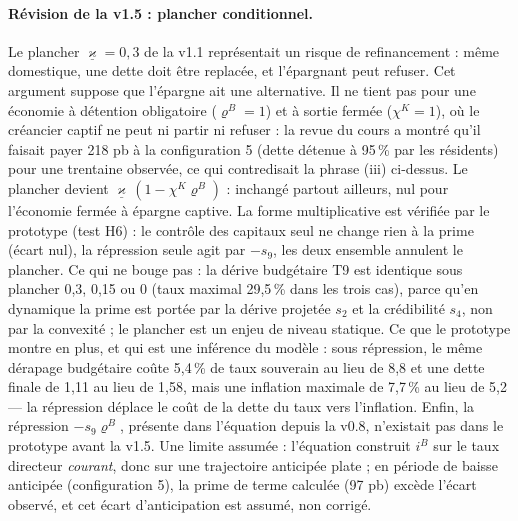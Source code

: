 \documentclass[11pt,a4paper]{article}
\begin{document}
\begin{lecture}
\paragraph{Révision de la v1.5 : plancher conditionnel.} Le plancher $\underline\varkappa=0{,}3$ de la v1.1 représentait un risque de refinancement : même domestique, une dette doit être replacée, et l'épargnant peut refuser. Cet argument suppose que l'épargne ait une alternative. Il ne tient pas pour une économie à détention obligatoire ($\varrho^B=1$) et à sortie fermée ($\chi^K=1$), où le créancier captif ne peut ni partir ni refuser : la revue du cours a montré qu'il faisait payer 218 pb à la configuration 5 (dette détenue à 95\,\% par les résidents) pour une trentaine observée, ce qui contredisait la phrase (iii) ci-dessus. Le plancher devient $\underline\varkappa\,(1-\chi^K\varrho^B)$ : inchangé partout ailleurs, nul pour l'économie fermée à épargne captive. La forme multiplicative est vérifiée par le prototype (test H6) : le contrôle des capitaux seul ne change rien à la prime (écart nul), la répression seule agit par $-s_9$, les deux ensemble annulent le plancher. Ce qui ne bouge pas : la dérive budgétaire T9 est identique sous plancher 0,3, 0,15 ou 0 (taux maximal 29,5\,\% dans les trois cas), parce qu'en dynamique la prime est portée par la dérive projetée $s_2$ et la crédibilité $s_4$, non par la convexité ; le plancher est un enjeu de niveau statique. Ce que le prototype montre en plus, et qui est une inférence du modèle : sous répression, le même dérapage budgétaire coûte 5,4\,\% de taux souverain au lieu de 8,8 et une dette finale de 1,11 au lieu de 1,58, mais une inflation maximale de 7,7\,\% au lieu de 5,2 — la répression déplace le coût de la dette du taux vers l'inflation. Enfin, la répression $-s_9\varrho^B$, présente dans l'équation depuis la v0.8, n'existait pas dans le prototype avant la v1.5. Une limite assumée : l'équation construit $i^B$ sur le taux directeur \emph{courant}, donc sur une trajectoire anticipée plate ; en période de baisse anticipée (configuration 5), la prime de terme calculée (97 pb) excède l'écart observé, et cet écart d'anticipation est assumé, non corrigé.
\end{lecture}
\end{document}
